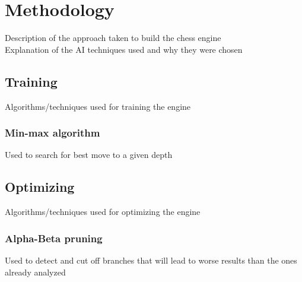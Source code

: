 \chapter{Methodology}
\label{chap:ch3}

Description of the approach taken to build the chess engine\\
Explanation of the AI techniques used and why they were chosen

\section{Training}
\label{sec:ch3sec1}

\par Algorithms/techniques used for training the engine

\subsection{Min-max algorithm}
\label{subsec:ch3sec1subsec1}

\par Used to search for best move to a given depth

\section{Optimizing}
\label{sec:ch3sec2}

\par Algorithms/techniques used for optimizing the engine

\subsection{Alpha-Beta pruning}
\label{subsec:ch3sec2subsec1}

\par Used to detect and cut off branches that will lead to worse results than the ones already analyzed